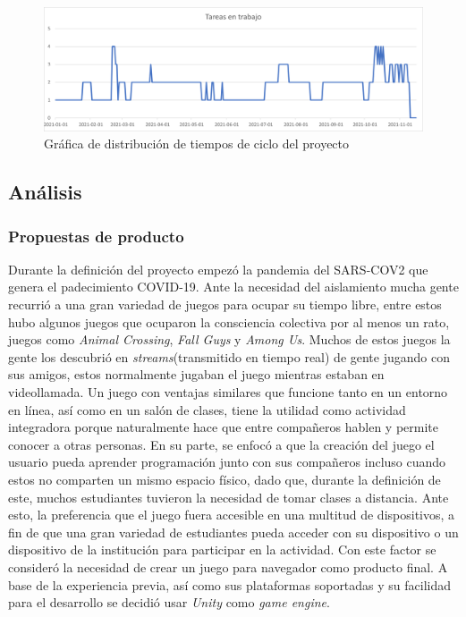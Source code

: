 \begin{figure}[H]
    \centering
    \includegraphics[width=0.8\linewidth]{images/TareasEnTrabajo.png}
    \caption{Gráfica de distribución de tiempos de ciclo del proyecto}
    \label{fig:grafica_tiempos_ciclo}
\end{figure}

\subsection{Análisis}
\subsubsection{Propuestas de producto}
Durante la definición del proyecto empezó la pandemia del SARS-COV2 que genera el padecimiento COVID-19. Ante la necesidad del aislamiento mucha gente recurrió a una gran variedad de juegos para ocupar su tiempo libre, entre estos hubo algunos juegos que ocuparon la consciencia colectiva por al menos un rato, juegos como \textit{Animal Crossing}, \textit{Fall Guys} y \textit{Among Us}. Muchos de estos juegos la gente los descubrió en \textit{streams}(transmitido en tiempo real) de gente jugando con sus amigos, estos normalmente jugaban el juego mientras estaban en videollamada. Un juego con ventajas similares que funcione tanto en un entorno en línea, así como en un salón de clases, tiene la utilidad como actividad integradora porque naturalmente hace que entre compañeros hablen y permite conocer a otras personas.
En su parte, se enfocó a que la creación del juego el usuario pueda aprender programación junto con sus compañeros incluso cuando estos no comparten un mismo espacio físico, dado que, durante la definición de este, muchos estudiantes tuvieron la necesidad de tomar clases a distancia. Ante esto, la preferencia que el juego fuera accesible en una multitud de dispositivos, a fin de que una gran variedad de estudiantes pueda acceder con su dispositivo o un dispositivo de la institución para participar en la actividad. Con este factor se consideró la necesidad de crear un juego para navegador como producto final. A base de la experiencia previa, así como sus plataformas soportadas y su facilidad para el desarrollo se decidió usar \textit{Unity} como \textit{game engine}.

